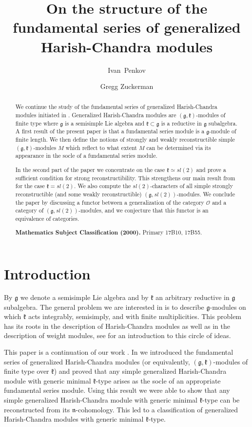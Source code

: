 \documentclass[11pt]{amsart}
\title[On the structure of the fundamental series of generalized Harish-Chandra modules]{On the structure of the fundamental series of generalized Harish-Chandra modules}
\author[Ivan Penkov]{\;Ivan~Penkov}
\author[Gregg Zuckerman]{\;Gregg Zuckerman}
\newcommand{\kk}{\mathfrak{k}}
\newcommand{\nn}{\mathfrak{n}}
\renewcommand{\gg}{\mathfrak{g}}
\begin{document}
\maketitle
\tableofcontents

\newpage
\begin{abstract}
We continue the study of the fundamental series of generalized Harish-Chandra modules initiated in \cite{PZ2}. Generalized Harish-Chandra modules are $(\gg,\kk)$-modules of finite type where $\gg$ is a semisimple Lie algebra and $\kk\subset\gg$  is a reductive in $\gg$ subalgebra. A first result of the present paper is that a fundamental series module is a $\gg$-module of finite length. We then define the notions of strongly and weakly reconstructible simple $(\gg,\kk)$-modules $M$ which reflect to what extent $M$ can be determined via its appearance in the socle of a fundamental series module. 

In the second part of the paper we concentrate on the case $\kk\simeq sl(2)$ and prove a sufficient condition for strong reconstructibility. This strengthens our main result from \cite{PZ2} for the case $\kk =sl(2)$. We also compute the $sl(2)$-characters of all simple strongly reconstructible (and some weakly reconstructible) $(\gg,sl(2))$-modules. We conclude the paper by discussing a functor between a generalization of the category $\mathcal{O}$ and a category of $(\gg,sl(2))$-modules, and we conjecture that this functor is an equivalence of categories.

\textbf{Mathematics Subject Classification (2000).} Primary 17B10, 17B55.
\end{abstract}
\section*{Introduction}
 By $\gg$ we denote a semisimple Lie algebra and by $\kk$ an arbitrary reductive in $\gg$ subalgebra. The general problem we are interested in is to describe $\gg$-modules on which $\kk$ acts integrably, semisimply, and with finite multiplicities. This problem has its roots in the description of Harish-Chandra modules as well as in the description of weight modules, see \cite{Z} for an introduction to this circle of ideas.

This paper is a continuation of our work \cite{PZ2}. In \cite{PZ2} we introduced the fundamental series of generalized Harish-Chandra modules (or equivalently, $(\gg,\kk)$-modules of finite type over $\kk$) and proved that any simple generalized Harish-Chandra module with generic minimal $\kk$-type arises as the socle of an appropriate fundamental series module. Using this result we were able to show that any simple generalized Harish-Chandra module with generic minimal $\kk$-type can be reconstructed from its $\nn$-cohomology. This led to a classification of generalized Harish-Chandra modules with generic minimal $\kk$-type.
\end{document}
